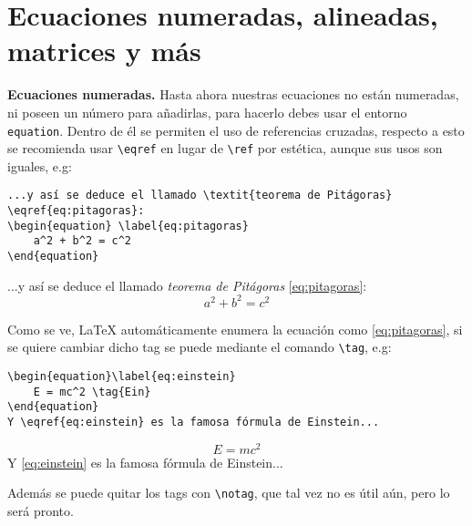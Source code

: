 \documentclass[intro-breve-latex.tex]{subfiles}
\begin{document}
\section{Ecuaciones numeradas, alineadas, matrices y más}
\textbf{Ecuaciones numeradas.} Hasta ahora nuestras ecuaciones no están numeradas, ni poseen un número para añadirlas, para hacerlo debes usar el entorno \texttt{equation}. Dentro de él se permiten el uso de referencias cruzadas, respecto a esto se recomienda usar \lstinline|\eqref| en lugar de \lstinline|\ref| por estética, aunque sus usos son iguales, e.g:
\begin{lstlisting}
...y así se deduce el llamado \textit{teorema de Pitágoras} \eqref{eq:pitagoras}:
\begin{equation} \label{eq:pitagoras}
	a^2 + b^2 = c^2
\end{equation}
\end{lstlisting}
...y así se deduce el llamado \textit{teorema de Pitágoras} \eqref{eq:pitagoras}:
\begin{equation} \label{eq:pitagoras}
	a^2 + b^2 = c^2
\end{equation}

Como se ve, \LaTeX{} automáticamente enumera la ecuación como \ref{eq:pitagoras}, si se quiere cambiar dicho tag se puede mediante el comando \lstinline|\tag|, e.g:
\begin{lstlisting}
\begin{equation}\label{eq:einstein}
	E = mc^2 \tag{Ein}
\end{equation}
Y \eqref{eq:einstein} es la famosa fórmula de Einstein...
\end{lstlisting}

\begin{equation}\label{eq:einstein}
	E = mc^2 \tag{Ein}
\end{equation}
Y \eqref{eq:einstein} es la famosa fórmula de Einstein...

Además se puede quitar los tags con \lstinline|\notag|, que tal vez no es útil aún, pero lo será pronto.
\end{document}
